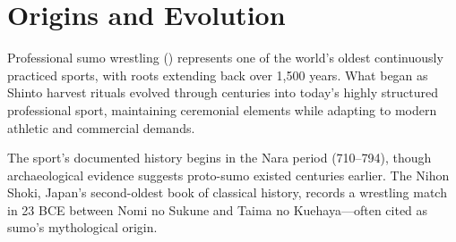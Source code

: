 \section{Origins and Evolution}

Professional sumo wrestling () represents one of the world's oldest continuously practiced sports, with roots extending back over 1,500 years. What began as Shinto harvest rituals evolved through centuries into today's highly structured professional sport, maintaining ceremonial elements while adapting to modern athletic and commercial demands.

The sport's documented history begins in the Nara period (710--794), though archaeological evidence suggests proto-sumo existed centuries earlier. The Nihon Shoki, Japan's second-oldest book of classical history, records a wrestling match in 23 BCE between Nomi no Sukune and Taima no Kuehaya---often cited as sumo's mythological origin.